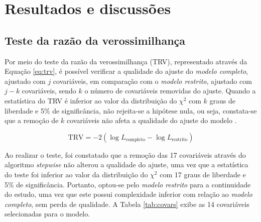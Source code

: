 \documentclass[twocolumn]{rbef}
\newcommand{\1}{\mathbbm{1}}
\begin{document}
\hypertarget{resultados-e-discussuxf5es}{%
\section{Resultados e discussões}\label{resultados-e-discussuxf5es}}

\hypertarget{teste-da-razuxe3o-da-verossimilhanuxe7a}{%
\subsection{Teste da razão da verossimilhança}\label{teste-da-razuxe3o-da-verossimilhanuxe7a}}

Por meio do teste da razão da verossimilhança (TRV), representado através da Equação \eqref{eq:trv}, é possível verificar a qualidade do ajuste do \textit{modelo completo}, ajustado com \(j\) covariáveis, em comparação com o \textit{modelo restrito}, ajustado com \(j-k\) covariáveis, sendo \(k\) o número de covariáveis removidas do ajuste. Quando a estatística do TRV é inferior ao valor da distribuição do \({\chi}^2\) com \(k\) graus de liberdade e 5\% de significância, não rejeita-se a hipótese nula, ou seja, constata-se que a remoção de \(k\) covariáveis não afeta a qualidade do ajuste do modelo \cite{Favero2017}.

\begin{equation}
\text{TRV} = -2(\log L_{\text{completo}} -\log L_{\text{restrito}})\label{eq:trv}
\end{equation}

Ao realizar o teste, foi constatado que a remoção das 17 covariáveis através do algoritmo \textit{stepwise} não alterou a qualidade do ajuste, uma vez que a estatística do teste foi inferior ao valor da distribuição do \({\chi}^2\) com 17 graus de liberdade e 5\% de significância. Portanto, optou-se pelo \textit{modelo restrito} para a continuidade do estudo, uma vez que este possui complexidade inferior com relação ao \textit{modelo completo}, sem perda de qualidade. A Tabela \ref{tab:covars} exibe as 14 covariáveis selecionadas para o modelo.
\end{document}
